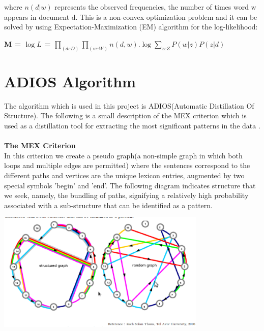 \documentclass{article}
\begin{document}
where \ensuremath{n(d|w)} represents the observed frequencies, the number of times word w appears in document d. This is a non-convex optimization problem and it can be solved by using Expectation-Maximization (EM) algorithm for the log-likelihood:\\

\begin{center}
\textbf{M = \ensuremath{\log L} = \ensuremath{\prod_{(d \ensuremath{\varepsilon} D)}\prod_{(w \ensuremath{\varepsilon} W)} n(d,w) . \ensuremath{\log \ensuremath{\sum_{z \ensuremath{\varepsilon} Z}} P(w|z)P(z|d) }}}
\end{center}

\section{ADIOS Algorithm}
The algorithm which is used in this project is ADIOS(Automatic Distillation Of Structure).
The following is a small description of the MEX criterion which is used as a distillation tool for extracting the most significant patterns in the data .\\ \\
{\large \bf The MEX Criterion}
\\
In this criterion we create a pseudo graph(a non-simple graph in which both loops and multiple edges are permitted) where the sentences correspond to the different paths and vertices are the unique lexicon entries, augmented by two special symbols 'begin' and 'end'. The following diagram indicates structure that we seek, namely, the bundling of paths, signifying a relatively high probability associated with a sub-structure that can be identified as a pattern.\\
\begin{center}\includegraphics[width=10cm]{graph.eps}\end{center}
	   
\end{document}
